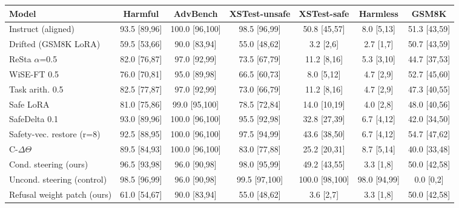 \begin{tabular}{lcccccc}
\toprule
Model & Harmful & AdvBench & XSTest-unsafe & XSTest-safe & Harmless & GSM8K \\
\midrule
Instruct (aligned) & 93.5 \scriptsize{[89,96]} & 100.0 \scriptsize{[96,100]} & 98.5 \scriptsize{[96,99]} & 50.8 \scriptsize{[45,57]} & 8.0 \scriptsize{[5,13]} & 51.3 \scriptsize{[43,59]} \\
Drifted (GSM8K LoRA) & 59.5 \scriptsize{[53,66]} & 90.0 \scriptsize{[83,94]} & 55.0 \scriptsize{[48,62]} & 3.2 \scriptsize{[2,6]} & 2.7 \scriptsize{[1,7]} & 50.7 \scriptsize{[43,59]} \\
\midrule
ReSta $\alpha$=0.5 & 82.0 \scriptsize{[76,87]} & 97.0 \scriptsize{[92,99]} & 73.5 \scriptsize{[67,79]} & 11.2 \scriptsize{[8,16]} & 5.3 \scriptsize{[3,10]} & 44.7 \scriptsize{[37,53]} \\
WiSE-FT 0.5 & 76.0 \scriptsize{[70,81]} & 95.0 \scriptsize{[89,98]} & 66.5 \scriptsize{[60,73]} & 8.0 \scriptsize{[5,12]} & 4.7 \scriptsize{[2,9]} & 52.7 \scriptsize{[45,60]} \\
Task arith. 0.5 & 82.5 \scriptsize{[77,87]} & 97.0 \scriptsize{[92,99]} & 73.0 \scriptsize{[66,79]} & 11.2 \scriptsize{[8,16]} & 4.7 \scriptsize{[2,9]} & 47.3 \scriptsize{[40,55]} \\
Safe LoRA & 81.0 \scriptsize{[75,86]} & 99.0 \scriptsize{[95,100]} & 78.5 \scriptsize{[72,84]} & 14.0 \scriptsize{[10,19]} & 4.0 \scriptsize{[2,8]} & 48.0 \scriptsize{[40,56]} \\
SafeDelta 0.1 & 93.0 \scriptsize{[89,96]} & 100.0 \scriptsize{[96,100]} & 95.5 \scriptsize{[92,98]} & 32.8 \scriptsize{[27,39]} & 6.7 \scriptsize{[4,12]} & 42.0 \scriptsize{[34,50]} \\
Safety-vec. restore (r=8) & 92.5 \scriptsize{[88,95]} & 100.0 \scriptsize{[96,100]} & 97.5 \scriptsize{[94,99]} & 43.6 \scriptsize{[38,50]} & 6.7 \scriptsize{[4,12]} & 54.7 \scriptsize{[47,62]} \\
C-$\Delta\Theta$ & 89.5 \scriptsize{[84,93]} & 100.0 \scriptsize{[96,100]} & 83.0 \scriptsize{[77,88]} & 25.2 \scriptsize{[20,31]} & 8.7 \scriptsize{[5,14]} & 40.0 \scriptsize{[33,48]} \\
Cond. steering (ours) & 96.5 \scriptsize{[93,98]} & 96.0 \scriptsize{[90,98]} & 98.0 \scriptsize{[95,99]} & 49.2 \scriptsize{[43,55]} & 3.3 \scriptsize{[1,8]} & 50.0 \scriptsize{[42,58]} \\
Uncond. steering (control) & 98.5 \scriptsize{[96,99]} & 96.0 \scriptsize{[90,98]} & 99.5 \scriptsize{[97,100]} & 100.0 \scriptsize{[98,100]} & 98.0 \scriptsize{[94,99]} & 0.0 \scriptsize{[0,2]} \\
Refusal weight patch (ours) & 61.0 \scriptsize{[54,67]} & 90.0 \scriptsize{[83,94]} & 55.0 \scriptsize{[48,62]} & 3.6 \scriptsize{[2,7]} & 3.3 \scriptsize{[1,8]} & 50.0 \scriptsize{[42,58]} \\
\bottomrule
\end{tabular}

